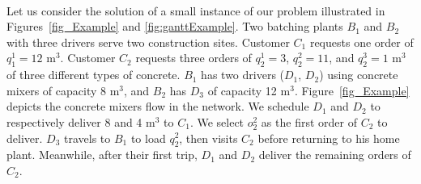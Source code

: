\documentclass{article}
\begin{document}
\iffalse
graphe: G=(V,A)
arc between origin depot, depot
arc between depot delivery node
arc between delivery node -> depot
arc between delivery node -> origin depot



Let $SLT^{bk}_{j}$ and $ELT^{bk}_{j}$ be the start and end loading time of driver $k$ at plant $b$. $SUT_{j}$, $EUT_{j}$ be the start and end unloading time. $LTS^{bk}_{j}=\left[ SLT^{bk}_{j}, ELT^{bk}_{j} \right] $, and $UTS^{bk}_{j}=\left[ SUT^{bk}_{j}, EUT^{bk}_{j} \right]$ stand for the loading  and unloading operations timeslots. $AT_{j}$ is the arrival time of a driver at the node location.

\begin{alignat}{2}
    \label{eq:ELT}  ELT^{bk}_{j} &= SLT^{bk}_{j}+ LD^b_{j}\\
    \label{eq:S}         EUT_{j} & = SUT_{j} + UD_{j}
\end{alignat}

For each delivery node $j$, we define an expected delivery time $EDT_{j}$ of unloading operation, the driver waiting duration $W^k_{j}$, and the node waiting time $W_{j}$.


\begin{alignat}{3}
    \label{eq:ES} EDT_{d^{p^l}_{ij}} &=
          \begin{cases}
            a_i & \text{if $j=0$, $l=0$}\\
            E_{d^{p^l}_{ij-1}} & \text{ $j \geq 1$}\\
            E_{d^{p^{l-1}}_{in^{p^{l-1}}_i}}  & 
          \end{cases} &  \\
    \label{eq:Wd} W^k_{d^p_{ij}} &= \max\{0, SUT_{d^p_{ij}} - AT_{d^p_{ij}}\} & \\
    \label{eq:Wc} W_{d^p_{ij}} & = \max\{0, AT_{d^p_{ij}} - EDT_{d^p_{ij}}- \lambda_i \} &
\end{alignat}

\fi

\paragraph*{}
Let us consider the solution of a small instance of our problem illustrated in Figures~\ref{fig_Example} and \ref{fig:ganttExample}. Two batching plants $B_1$ and $B_2$ with three drivers serve two construction sites. Customer $C_1$ requests one order of $q^1_1=12$ m$^3$. Customer $C_2$ requests three orders of $q^1_2=3$, $q^2_2=11$, and $q^3_2=1$ m$^3$ of three different types of concrete. $B_1$ has two drivers ($D_1$, $D_2$) using concrete mixers of capacity 8 m$^3$, and $B_2$ has $D_3$ of capacity 12 m$^3$. Figure~\ref{fig_Example} depicts the concrete mixers flow in the network. We schedule $D_1$ and $D_2$ to respectively deliver 8 and 4 m$^3$ to $C_1$. We select $o^2_2$ as the first order of $C_2$ to deliver. $D_3$ travels to $B_1$ to load $q^2_2$, then visits $C_2$ before returning to his home plant. Meanwhile, after their first trip,  $D_1$ and $D_2$ deliver the remaining orders of $C_2$.
\end{document}
